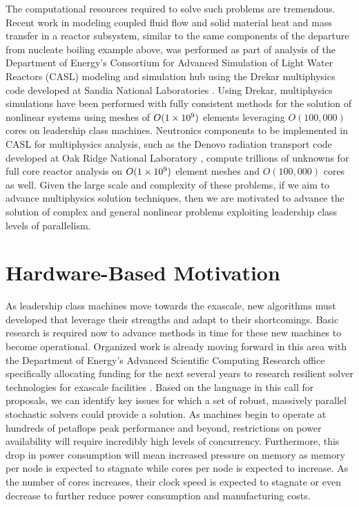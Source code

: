 The computational resources required to solve such problems are
tremendous. Recent work in modeling coupled fluid flow and solid
material heat and mass transfer in a reactor subsystem, similar to the
same components of the departure from nucleate boiling example above,
was performed as part of analysis of the Department of Energy's
Consortium for Advanced Simulation of Light Water Reactors (CASL)
modeling and simulation hub using the Drekar multiphysics code
developed at Sandia National Laboratories
\citep{pawlowski_drekar_2012}. Using Drekar, multiphysics simulations
have been performed with fully consistent methods for the solution of
nonlinear systems using meshes of $O(1\times 10^{9})$ elements leveraging
$O(100,000)$ cores on leadership class machines. Neutronics components
to be implemented in CASL for multiphysics analysis, such as the
Denovo radiation transport code developed at Oak Ridge National
Laboratory \citep{evans_denovo:_2010}, compute trillions of unknowns
for full core reactor analysis on $O(1\times 10^{9})$ element meshes and
$O(100,000)$ cores as well. Given the large scale and complexity of
these problems, if we aim to advance multiphysics solution techniques,
then we are motivated to advance the solution of complex and general
nonlinear problems exploiting leadership class levels of parallelism.

\section{Hardware-Based Motivation}
\label{sec:hardware_motivation}
As leadership class machines move towards the exascale, new algorithms
must developed that leverage their strengths and adapt to their
shortcomings. Basic research is required now to advance methods in
time for these new machines to become operational. Organized work is
already moving forward in this area with the Department of Energy's
Advanced Scientific Computing Research office specifically allocating
funding for the next several years to research resilient solver
technologies for exascale facilities
\citep{u.s._department_of_energy_resilient_2012}. Based on the
language in this call for proposals, we can identify key issues for
which a set of robust, massively parallel stochastic solvers could
provide a solution. As machines begin to operate at hundreds of
petaflops peak performance and beyond, restrictions on power
availability will require incredibly high levels of
concurrency. Furthermore, this drop in power consumption will mean
increased pressure on memory as memory per node is expected to
stagnate while cores per node is expected to increase. As the number
of cores increases, their clock speed is expected to stagnate or even
decrease to further reduce power consumption and manufacturing costs.

